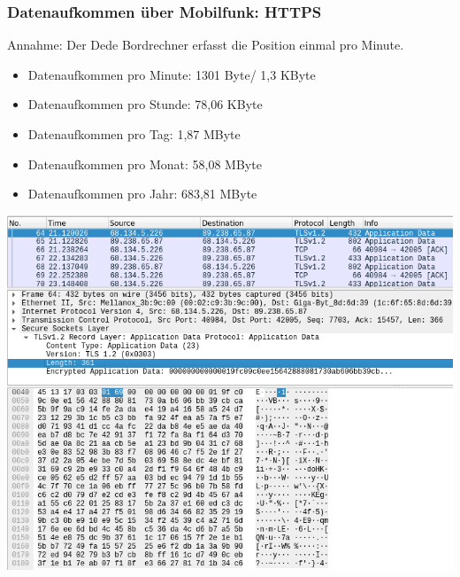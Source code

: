 \begin{frame}
  \frametitle{Datenaufkommen über Mobilfunk: HTTPS}
  Annahme: Der Dede Bordrechner erfasst die Position einmal pro Minute.
  \begin{itemize}
  \item Datenaufkommen pro Minute: 1301 Byte/ 1,3 KByte
  \item Datenaufkommen pro Stunde: 78,06 KByte
  \item Datenaufkommen pro Tag: 1,87 MByte
  \item Datenaufkommen pro Monat: 58,08 MByte
  \item Datenaufkommen pro Jahr: 683,81 MByte
  \end{itemize}
  \includegraphics[width=0.5\paperwidth]{dede/dede-obc-wireshark-https-post}
\end{frame}
